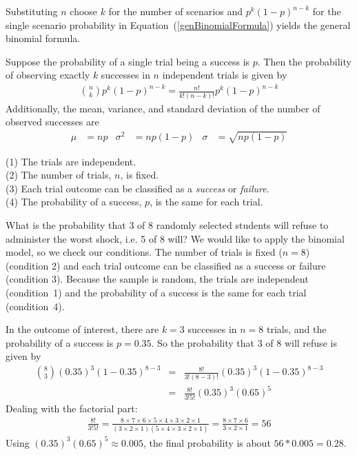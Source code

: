 Substituting $n$ choose $k$ for the number of scenarios and $p^k(1-p)^{n-k}$ for the single scenario probability in Equation~(\ref{genBinomialFormula}) yields the general binomial formula.

\begin{termBox}{ Suppose the probability of a single trial being a success is $p$. Then the probability of observing exactly $k$ successes in $n$ independent trials is given by\vspace{-1mm}
\begin{eqnarray}
{n\choose k}p^k(1-p)^{n-k} = \frac{n!}{k!(n-k)!}p^k(1-p)^{n-k}
\label{binomialFormula}
\end{eqnarray}
Additionally, the mean, variance, and standard deviation of the number of observed successes are\vspace{-2mm}
\begin{align}
\mu &= np
	&\sigma^2 &= np(1-p)
	&\sigma &= \sqrt{np(1-p)}
\label{binomialStats}
\end{align}}
\end{termBox}

\begin{tipBox}{
(1) The trials are independent. \\
(2) The number of trials, $n$, is fixed. \\
(3) Each trial outcome can be classified as a \emph{success} or \emph{failure}. \\
(4) The probability of a success, $p$, is the same for each trial.}
\end{tipBox}

\begin{example}{What is the probability that 3 of 8 randomly selected students will refuse to administer the worst shock, i.e. 5 of 8 will?}
We would like to apply the binomial model, so we check our conditions. The number of trials is fixed ($n=8$) (condition 2) and each trial outcome can be classified as a success or failure (condition 3). Because the sample is random, the trials are independent (condition~1) and the probability of a success is the same for each trial (condition~4).

In the outcome of interest, there are $k=3$ successes in $n=8$ trials, and the probability of a success is $p=0.35$. So the probability that 3 of 8 will refuse is given by
\begin{eqnarray*}
{ 8 \choose 3}(0.35)^3(1-0.35)^{8-3}
	&=& \frac{8!}{3!(8-3)!}(0.35)^3(1-0.35)^{8-3} \\
	&=& \frac{8!}{3!5!}(0.35)^3(0.65)^5
\end{eqnarray*}
Dealing with the factorial part:
\begin{eqnarray*}
\frac{8!}{3!5!} = \frac{8\times7\times6\times5\times4\times3\times2\times1}{(3\times2\times1)(5\times4\times3\times2\times1)} = \frac{8\times7\times6}{3\times2\times1} = 56
\end{eqnarray*}
Using $(0.35)^3(0.65)^5 \approx 0.005$, the final probability is about $56*0.005 = 0.28$.
\end{example}


